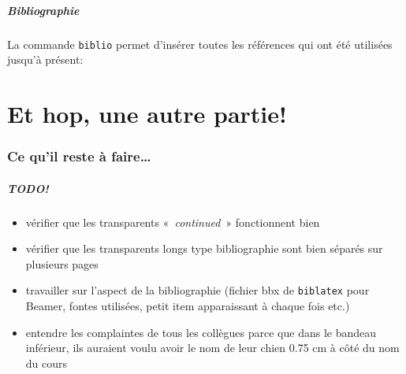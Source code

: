 \documentclass[fr,biblatex,outline]{isae-slides}
\begin{document}
\begin{frame}
\frametitle{Bibliographie}

La commande \lstinline!biblio! permet d'insérer toutes les références
qui ont été utilisées jusqu'à présent:



\nocite{mittelbach04:_latex}
\biblio{}

\end{frame}

\part<presentation>[Autre partie pour voir]{Et hop, une autre partie!}

\section{Ce qu'il reste à faire\ldots}
\label{sec:todo}

\begin{frame}
\frametitle{TODO!}

\begin{itemize}
\item vérifier que les transparents «~\textit{continued}~»
  fonctionnent bien
\item vérifier que les transparents longs type bibliographie sont bien
  séparés sur plusieurs pages
\item travailler sur l'aspect de la bibliographie (fichier bbx de
  \texttt{biblatex} pour Beamer, fontes utilisées, petit item
  apparaissant à chaque fois etc.)
\item entendre les complaintes de tous les collègues parce que dans le
  bandeau inférieur, ils auraient voulu avoir le nom de leur chien
  0.75 cm à côté du nom du cours \smiley

\end{itemize}

\end{frame}
\end{document}
